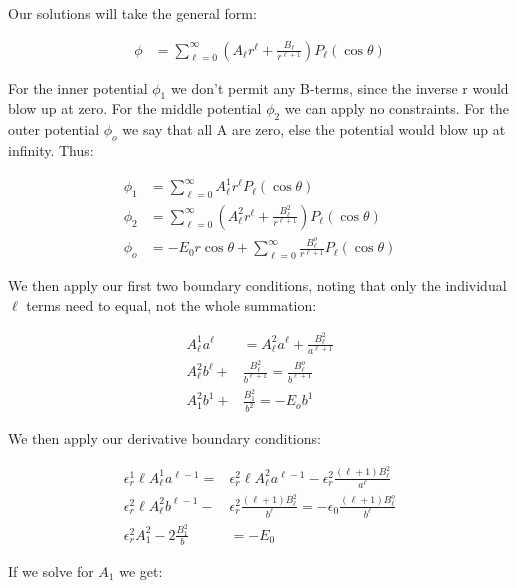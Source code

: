 \documentclass[10pt]{article} %
\begin{document}
Our solutions will take the general form:

\begin{align*}
  \phi &= \sum_{\ell = 0}^\infty \left(A_\ell r^\ell + \frac{B_\ell}{r^{\ell+1}}\right)P_\ell(\cos\theta)
\end{align*}

For the inner potential $\phi_1$ we don't permit any B-terms, since the inverse r would blow up at zero. For the middle potential $\phi_2$ we can apply no constraints. For the outer potential $\phi_o$ we say that all A are zero, else the potential would blow up at infinity. Thus:

\begin{align*}
  \phi_1 &= \sum_{\ell = 0}^\infty A^1_\ell r^\ell P_\ell(\cos\theta)\\
  \phi_2 &= \sum_{\ell = 0}^\infty \left(A^2_\ell r^\ell + \frac{B^2_\ell}{r^{\ell+1}}\right)P_\ell(\cos\theta)\\
  \phi_o &= -E_0r\cos\theta + \sum_{\ell = 0}^\infty \frac{B^o_\ell}{r^{\ell+1}}P_\ell(\cos\theta)
\end{align*}

We then apply our first two boundary conditions, noting that only the individual $\ell$ terms need to equal, not the whole summation:

\begin{align*}
  A^1_\ell a^\ell &= A^2_\ell a^\ell + \frac{B^2_\ell}{a^{\ell+1}}\\
  A^2_\ell b^\ell +& \frac{B^2_\ell}{b^{\ell+1}} = \frac{B^o_\ell}{b^{\ell+1}}\\
  A^2_1 b^1 +& \frac{B^2_1}{b^2} = -E_ob^1
\end{align*}

We then apply our derivative boundary conditions:

\begin{align*}
  \epsilon_r^1\ell A^1_\ell a^{\ell-1} =& \epsilon_r^2\ell A^2_\ell a^{\ell-1} - \epsilon_r^2\frac{\left(\ell+1\right)B^2_\ell}{a^\ell}\\
  \epsilon_r^2\ell A^2_\ell b^{\ell-1} -& \epsilon_r^2\frac{\left(\ell+1\right)B^2_\ell}{b^\ell}
  = -\epsilon_0\frac{\left(\ell+1\right)B^o_\ell}{b^\ell}\\
  \epsilon_r^2A^2_1 -2\frac{B_1^2}{b} &= -E_0
\end{align*}

If we solve for $A_1$ we get:
\end{document}
